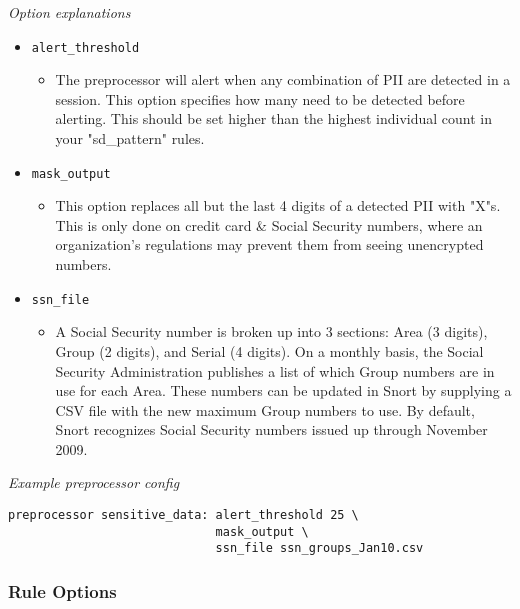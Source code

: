 \documentclass[english]{report}
\begin{document}
\textit{Option explanations}
\begin{itemize}
\item[] \texttt{alert\_threshold}
\begin{itemize}

\item[] The preprocessor will alert when any combination of PII are detected
in a session. This option specifies how many need to be detected before
alerting.
This should be set higher than the highest individual count in your
"sd\_pattern" rules.

\end{itemize}

\item[] \texttt{mask\_output}
\begin{itemize}

\item[] This option replaces all but the last 4 digits of a detected PII with
"X"s. This is only done on credit card \& Social Security numbers, where
an organization's regulations may prevent them from seeing unencrypted
numbers.

\end{itemize}

\item[] \texttt{ssn\_file}
\begin{itemize}

\item[] A Social Security number is broken up into 3 sections:
Area (3 digits), Group (2 digits), and Serial (4 digits).
On a monthly basis, the Social Security Administration publishes a list
of which Group numbers are in use for each Area.
These numbers can be updated in Snort by supplying a CSV file with the
new maximum Group numbers to use.
By default, Snort recognizes Social Security numbers issued up through
November 2009.

\end{itemize}
\end{itemize}

\textit{Example preprocessor config}
\begin{verbatim}
preprocessor sensitive_data: alert_threshold 25 \
                             mask_output \
                             ssn_file ssn_groups_Jan10.csv
\end{verbatim}

\subsubsection{Rule Options}
\end{document}
